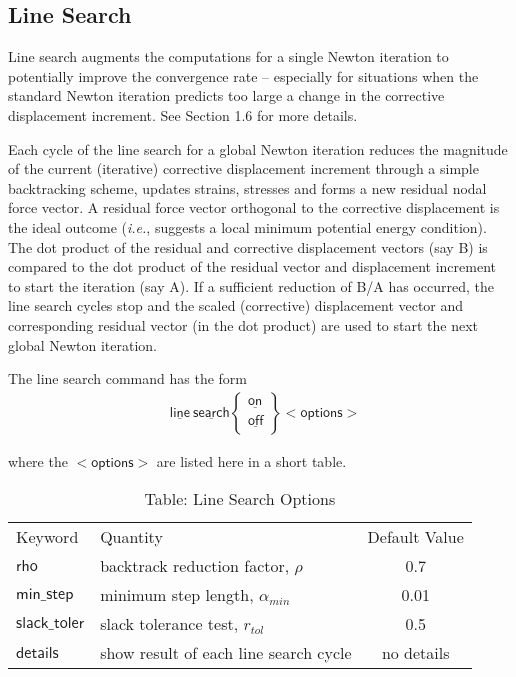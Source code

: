\documentclass[11pt]{report}
\numberwithin{equation}{section}
\newcommand{\nin} {\noindent}
\newcommand{\ul} {\underline}
\newcommand{\hv} {\mathsf}   %
\newcommand{\ie}{\emph{i.e.},\xspace}
\begin{document}
\subsection{Line Search}
\nin Line search augments the computations for a single Newton iteration to potentially
improve the convergence rate -- especially for situations when the standard
Newton iteration predicts too large a change in the corrective displacement
increment. See Section 1.6 for more details.

Each cycle of the line search for a global Newton iteration reduces the
magnitude of the current (iterative) corrective displacement increment
through a simple backtracking scheme, updates
strains, stresses and forms a new residual nodal force vector.  A residual force
vector orthogonal to the corrective displacement is the ideal outcome (\ie
suggests a local minimum potential energy condition). The dot product of the
residual and corrective displacement vectors  (say B) is compared to the
dot product of the residual vector and displacement increment to start the 
iteration (say A).  If a sufficient reduction of B/A has occurred, the line search cycles stop and the
scaled (corrective) displacement vector and corresponding residual vector (in the dot product)
are used to start the next global Newton iteration.

The line search command has the form 
\begin{align*}
&\hv{\ul{line}\  \ul{search}}
\begin{Bmatrix}
\hv{\ul{on}}\\ \hv{\ul{off}}
\end{Bmatrix}
\hv{<options>}
\end{align*}

\nin where the $\hv{<options>}$ are listed here in a short table.


%
\begin{table}[htb] \small 
\centering
{
\setlength{\extrarowheight}{5.0pt}
\begin{tabular}{ p{0.8in} l c  }
Keyword & Quantity & Default Value \\
$\hv{rho}$ & backtrack reduction factor, $\rho$ & 0.7\\ 
$\hv{min\_step}$ & minimum step length, $\alpha_{min}$& 0.01 \\
$\hv{slack\_toler}$ & slack tolerance test, $r_{tol}$ &0.5 \\
$\hv{details}$ & show result of each line search cycle& no details \\
\end{tabular}
} 
\caption{Table: Line Search Options}
\normalsize	
\end{table}
\end{document}
